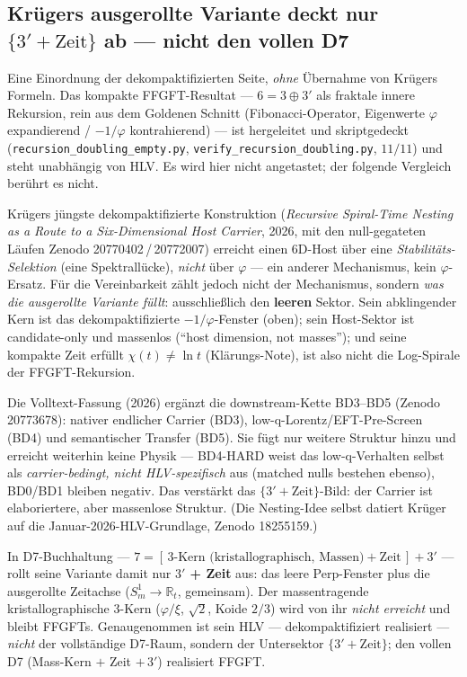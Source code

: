 \subsection{Kr\"ugers ausgerollte Variante deckt nur $\{3'+\text{Zeit}\}$ ab --- nicht den vollen D7}
Eine Einordnung der dekompaktifizierten Seite, \emph{ohne} \"Ubernahme von Kr\"ugers Formeln. Das
kompakte FFGFT-Resultat --- $6=3\oplus3'$ als fraktale innere Rekursion, rein aus dem Goldenen
Schnitt (Fibonacci-Operator, Eigenwerte $\varphi$ expandierend / $-1/\varphi$ kontrahierend) ---
ist hergeleitet und skriptgedeckt (\texttt{recursion\_doubling\_empty.py},
\texttt{verify\_recursion\_doubling.py}, $11/11$) und steht unabh\"angig von HLV. Es wird hier nicht
angetastet; der folgende Vergleich ber\"uhrt es nicht.

Kr\"ugers j\"ungste dekompaktifizierte Konstruktion (\emph{Recursive Spiral-Time Nesting as a Route
to a Six-Dimensional Host Carrier}, 2026, mit den null-gegateten L\"aufen Zenodo
20770402\,/\,20772007) erreicht einen $6$D-Host \"uber eine \emph{Stabilit\"ats-Selektion} (eine
Spektrall\"ucke), \emph{nicht} \"uber $\varphi$ --- ein anderer Mechanismus, kein
$\varphi$-Ersatz. F\"ur die Vereinbarkeit z\"ahlt jedoch nicht der Mechanismus, sondern \emph{was
die ausgerollte Variante f\"ullt}: ausschlie\ss lich den \textbf{leeren} Sektor. Sein abklingender
Kern ist das dekompaktifizierte $-1/\varphi$-Fenster (oben); sein Host-Sektor ist candidate-only und
massenlos (\enquote{host dimension, not masses}); und seine kompakte Zeit erf\"ullt
$\chi(t)\neq\ln t$ (Kl\"arungs-Note), ist also nicht die Log-Spirale der FFGFT-Rekursion.

Die Volltext-Fassung (2026) erg\"anzt die downstream-Kette BD3--BD5 (Zenodo 20773678): nativer
endlicher Carrier (BD3), low-q-Lorentz/EFT-Pre-Screen (BD4) und semantischer Transfer (BD5). Sie
f\"ugt nur weitere Struktur hinzu und erreicht weiterhin keine Physik --- BD4-HARD weist das
low-q-Verhalten selbst als \emph{carrier-bedingt, nicht HLV-spezifisch} aus (matched nulls bestehen
ebenso), BD0/BD1 bleiben negativ. Das verst\"arkt das $\{3'+\text{Zeit}\}$-Bild: der Carrier ist
elaboriertere, aber massenlose Struktur. (Die Nesting-Idee selbst datiert Kr\"uger auf die
Januar-2026-HLV-Grundlage, Zenodo 18255159.)

In D7-Buchhaltung --- $7=[\,3\text{-Kern (kristallographisch, Massen)}+\text{Zeit}\,]+3'$ --- rollt
seine Variante damit nur \textbf{$3'$ + Zeit} aus: das leere Perp-Fenster plus die ausgerollte
Zeitachse ($S^1_m\to\mathbb{R}_t$, gemeinsam). Der massentragende kristallographische $3$-Kern
($\varphi/\xi$, $\sqrt2$, Koide $2/3$) wird von ihr \emph{nicht erreicht} und bleibt FFGFTs.
Genaugenommen ist sein HLV --- dekompaktifiziert realisiert --- \emph{nicht} der vollst\"andige
D7-Raum, sondern der Untersektor $\{3'+\text{Zeit}\}$; den vollen D7 (Mass-Kern $+$ Zeit $+\,3'$)
realisiert FFGFT.

